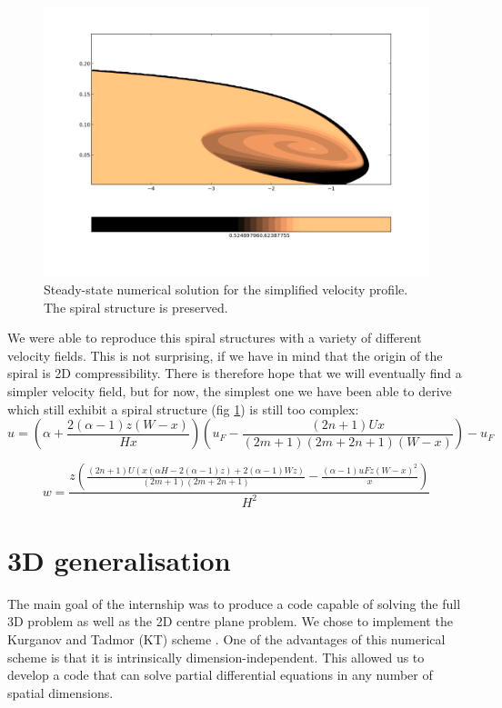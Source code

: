  \begin{figure}[htp]
\centering
\includegraphics[scale=0.4]{images/rational_profile_spiral.png}
\caption{Steady-state numerical solution for the simplified velocity profile. The spiral structure is preserved.}
\label{rational}
\end{figure}


We were able to reproduce this spiral structures with a variety of different velocity fields. This is not surprising, if we have in mind that the origin of the spiral is 2D compressibility. 
There is therefore hope that we will eventually find a simpler velocity field, but for now, the simplest one we have been able to derive which still exhibit a spiral structure (fig \ref{rational}) is still too complex:
\[
 u =
 \left(
 \alpha 
 +\frac{2 (\alpha -1) z (W-x)}{H x}
 \right) 
 \left(
 u_F
 -\frac{(2 n+1) U x}{(2 m+1) (2 m+2 n+1) (W-x)}
 \right)-u_F
\]

\[
 w = 
 \frac{z \left(\frac{(2 n+1) U (x (\alpha  H-2 (\alpha -1) z)+2 (\alpha -1) W z)}{(2 m+1) (2 m+2 n+1)}-\frac{(\alpha -1) uF z (W-x)^2}{x}\right)}{H^2}
 \]

\section{3D generalisation}

The main goal of the internship was to produce a code capable of solving the full 3D problem as well as the 2D centre plane problem.
We chose to implement the Kurganov and Tadmor (KT) scheme \cite{KT}.
One of the advantages of this numerical scheme is that it is intrinsically dimension-independent. This allowed us to develop a code that can solve partial differential equations in any number of spatial dimensions. 

